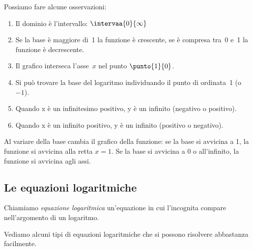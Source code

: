 \begin{minipage}{.52\textwidth}
 Possiamo fare alcune osservazioni:
\begin{enumerate}
 \item Il dominio è l'intervallo: \(\intervaa{0}{\infty}\)
 \item Se la base è maggiore di~1 la funzione è crescente, 
 se è compresa tra~0 e~1 la funzione è decrescente.
 \item Il grafico interseca l'asse~\(x\) nel punto \(\punto{1}{0}\).
 \item Si può trovare la base del logaritmo individuando il punto di 
 ordinata~1 (o~\(-1\)).
 \item Quando x è un infinitesimo positivo, y è un infinito (negativo o 
positivo).
 \item Quando x è un infinito positivo, y è un infinito (positivo o 
negativo).
\end{enumerate}
\end{minipage} \qquad 
\begin{minipage}{.45\textwidth}
 \begin{inaccessibleblock}
  \logdiversebasi
\label{fig:diversebasi}
\end{inaccessibleblock}
\label{fig:log_diversebasi}
\end{minipage}

\vspace{.5cm}

Al variare della base cambia il grafico della funzione: 
se la base si avvicina a 1, la funzione si avvicina 
alla retta \(x=1\). 
Se la base si avvicina a 0 o all'infinito, la funzione si avvicina agli 
assi.

\subsection{Le equazioni logaritmiche}
\label{subsec:esplog_equazionilogaritmiche}

\begin{definizione}{
Chiamiamo \emph{equazione logaritmica} un'equazione in cui l'incognita 
compare nell'argomento di un logaritmo.}
\end{definizione}

Vediamo alcuni tipi di equazioni logaritmiche che si possono risolvere 
abbastanza facilmente.

